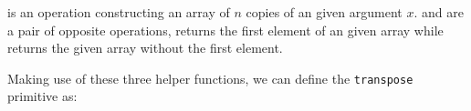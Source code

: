 \documentclass{l4proj}
\begin{document}
\newpage %
 is an operation constructing an array of $n$ copies of an given argument $x$.  and  are a pair of opposite operations,  returns the first element of an given array while  returns the given array without the first element.

Making use of these three helper functions, we can define the \texttt{transpose} primitive as:
\begin{code}%
\>[0]\<%
\\
\>[0]\AgdaSpace{}%
\AgdaSymbol{:}\AgdaSpace{}%
\AgdaSymbol{\{}\AgdaSpace{}%
\AgdaSpace{}%
\AgdaSymbol{:}\AgdaSpace{}%
\AgdaSymbol{\}}\AgdaSpace{}%
\AgdaSpace{}%
\AgdaSymbol{\{}\AgdaSpace{}%
\AgdaSymbol{:}\AgdaSpace{}%
\AgdaSymbol{\}}\AgdaSpace{}%
\AgdaSpace{}%
\AgdaSpace{}%
\AgdaSymbol{(}\AgdaSpace{}%
\AgdaSpace{}%
\AgdaSymbol{)}\AgdaSpace{}%
\AgdaSpace{}%
\AgdaSpace{}%
\AgdaSpace{}%
\AgdaSymbol{(}\AgdaSpace{}%
\AgdaSpace{}%
\AgdaSymbol{)}\AgdaSpace{}%
\<%
\\
\>[0]\AgdaSpace{}%
\AgdaSymbol{\{}\AgdaSpace{}%
\AgdaSymbol{\}}\AgdaSpace{}%
\AgdaSymbol{\{}\AgdaSymbol{\}}\AgdaSpace{}%
\AgdaSpace{}%
\AgdaSymbol{=}\AgdaSpace{}%
\AgdaInductiveConstructor{[]}\<%
\\
\>[0]\AgdaSpace{}%
\AgdaSymbol{\{}\AgdaSymbol{\}}\AgdaSpace{}%
\AgdaSymbol{\{}\AgdaSymbol{\}}\AgdaSpace{}%
\AgdaInductiveConstructor{[]}\AgdaSpace{}%
\AgdaSymbol{=}\AgdaSpace{}%
\AgdaSpace{}%
\AgdaSymbol{\AgdaUnderscore{}}\AgdaSpace{}%
\AgdaInductiveConstructor{[]}\<%
\\
\>[0]\AgdaSpace{}%
\AgdaSymbol{\{}\AgdaSpace{}%
\AgdaSymbol{\}}\AgdaSpace{}%
\AgdaSymbol{\{}\AgdaSpace{}%
\AgdaSymbol{\}}\AgdaSpace{}%
\AgdaSpace{}%
\AgdaSymbol{=}\AgdaSpace{}%
\AgdaSpace{}%
\AgdaSpace{}%
\AgdaSpace{}%
\AgdaSpace{}%
\AgdaSpace{}%
\AgdaSymbol{(}\AgdaSpace{}%
\AgdaSpace{}%
\AgdaSymbol{)}\<%
\end{code}
\end{document}
